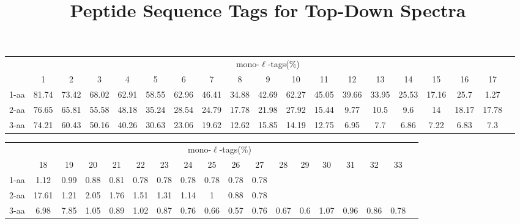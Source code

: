 \documentclass{article}[12pt]
\title{Peptide Sequence Tags for Top-Down Spectra}
\author{}
\begin{document}
\maketitle

\doublespacing
\begin{abstract}


\end{abstract}


\begin{landscape}

\begin{table}[h]\tiny
\vspace{3mm}
{\centering
\begin{center}
\begin{tabular}{|l|c|c|c|c|c|c|c|c|c|c|c|c|c|c|c|c|c|c|}
  \hline
  & \multicolumn{ 17 }{|c|}{mono-$\ell$-tags(\%)} \\
  \cline{2- 18}
    & 1 & 2 & 3 & 4 & 5 & 6 & 7 & 8 & 9 & 10 & 11 & 12 & 13 & 14 & 15 & 16 & 17\\
  \hline
1-aa  & 81.74 & 73.42 & 68.02 & 62.91 & 58.55 & 62.96 & 46.41 & 34.88 & 42.69 & 62.27 & 45.05 & 39.66 & 33.95 & 25.53 & 17.16 & 25.7 & 1.27\\
2-aa  & 76.65 & 65.81 & 55.58 & 48.18 & 35.24 & 28.54 & 24.79 & 17.78 & 21.98 & 27.92 & 15.44 & 9.77 & 10.5 & 9.6 & 14 & 18.17 & 17.78\\
3-aa  & 74.21 & 60.43 & 50.16 & 40.26 & 30.63 & 23.06 & 19.62 & 12.62 & 15.85 & 14.19 & 12.75 & 6.95 & 7.7 & 6.86 & 7.22 & 6.83 & 7.3\\
 \hline
\end{tabular}
\end{center}
\par}
\centering

\vspace{3mm}
\end{table}
\begin{table}[h]\tiny
\vspace{3mm}
{\centering
\begin{center}
\begin{tabular}{|l|c|c|c|c|c|c|c|c|c|c|c|c|c|c|c|c|c|}
  \hline
  & \multicolumn{ 16 }{|c|}{mono-$\ell$-tags(\%)} \\
  \cline{2- 17}
    & 18 & 19 & 20 & 21 & 22 & 23 & 24 & 25 & 26 & 27 & 28 & 29 & 30 & 31 & 32 & 33\\
  \hline
1-aa  & 1.12 & 0.99 & 0.88 & 0.81 & 0.78 & 0.78 & 0.78 & 0.78 & 0.78 & 0.78 &  &  &  &  &  & \\
2-aa  & 17.61 & 1.21 & 2.05 & 1.76 & 1.51 & 1.31 & 1.14 & 1 & 0.88 & 0.78 &  &  &  &  &  & \\
3-aa  & 6.98 & 7.85 & 1.05 & 0.89 & 1.02 & 0.87 & 0.76 & 0.66 & 0.57 & 0.76 & 0.67 & 0.6 & 1.07 & 0.96 & 0.86 & 0.78\\
 \hline
\end{tabular}
\end{center}
\par}
\centering


\end{table}
\end{landscape}
\end{document}
